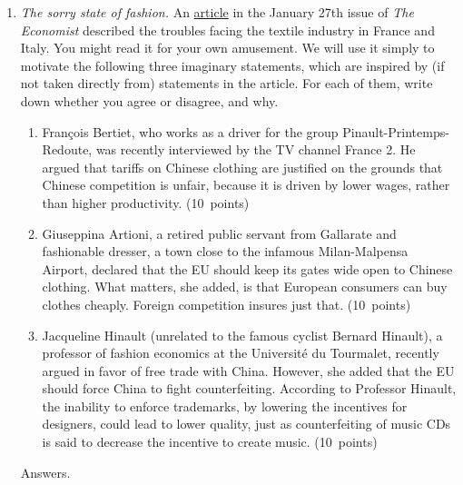 \documentclass[letterpaper,12pt]{article}
\begin{document}
\begin{enumerate}
\begin{enumerate}
\end{enumerate}


\item {\it The sorry state of fashion.} An
\href{http://www.economist.com/displaystory.cfm?story_id=3599862}{article}
in the January 27th issue of {\it The Economist\/} described the
troubles facing the textile industry in France and Italy. You
might read it for your own amusement.  We will use it simply to
motivate the following three imaginary statements, which are
inspired by (if not taken directly from) statements in the
article. For each of them, write down whether you agree or
disagree, and why.

\begin{enumerate}

\item Fran\c{c}ois Bertiet, who works as a driver for the group
Pinault-Printemps-Redoute, was recently interviewed by the TV
channel France 2. He argued that tariffs on Chinese clothing are
justified on the grounds that Chinese competition is unfair,
because it is driven by lower wages, rather than higher
productivity. (10~points)

\item Giuseppina Artioni, a retired public servant from Gallarate
and fashionable dresser, a town close to the infamous
Milan-Malpensa Airport, declared that the EU should keep its gates
wide open to Chinese clothing. What matters, she added, is that
European consumers can buy clothes cheaply. Foreign competition
insures just that. (10~points)

\item Jacqueline Hinault (unrelated to the famous cyclist Bernard
Hinault), a professor of fashion economics at the Universit\'{e}
du Tourmalet, recently argued in favor of free trade with China.
However, she added that the EU should force China to fight
counterfeiting. According to Professor Hinault, the inability to
enforce trademarks, by lowering the incentives for designers,
could lead to lower quality, just as counterfeiting of music CDs
is said to decrease the incentive to create music.  (10~points)

\end{enumerate}

Answers.
\begin{enumerate}


\end{enumerate}
\end{enumerate}
\end{document}
